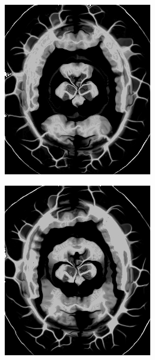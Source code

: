 \begin{figure}[H]
\begin{subfigure}[t]{0.25\textwidth}
	  \includegraphics[width=\textwidth]{figuras/resultDistDemons.png}
	  \label{fig:dist-image-demon}
	\end{subfigure}
	\begin{subfigure}[t]{0.25\textwidth}
	  \includegraphics[width=\textwidth]{figuras/resultSinDistDemon.png}

\end{subfigure}
\end{figure}
